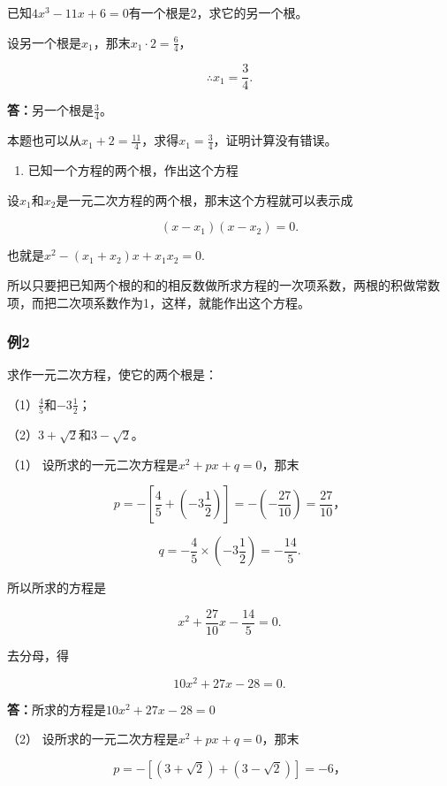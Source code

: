 已知\(4x^{3} - 11x + 6 = 0\)有一个根是2，求它的另一个根。

设另一个根是\(x_{1}\)，那末\(x_{1} \cdot 2 = \frac{6}{4}\)，

\[
\therefore x _ {1} = \frac{3}{4}.
\]

\textbf{答：}另一个根是\(\frac{3}{4}\)。

本题也可以从\(x_{1} + 2 = \frac{11}{4}\)，求得\(x_{1} = \frac{3}{4}\)，证明计算没有错误。

\begin{enumerate}[start=2]
\item
  已知一个方程的两个根，作出这个方程
\end{enumerate}

设\(x_{1}\)和\(x_{2}\)是一元二次方程的两个根，那末这个方程就可以表示成

\[
(x - x _ {1}) (x - x _ {2}) = 0.
\]

也就是\(x^{2} - (x_{1} + x_{2})x + x_{1}x_{2} = 0.\)

所以只要把已知两个根的和的相反数做所求方程的一次项系数，两根的积做常数项，而把二次项系数作为1，这样，就能作出这个方程。

\subsubsection{例2}

求作一元二次方程，使它的两个根是：

（1）\(\frac{4}{5}\)和\(-3\frac{1}{2}\)；

（2）\(3 + \sqrt{2}\)和\(3 - \sqrt{2}\)。

 （1） 设所求的一元二次方程是\(x^{2} + px + q = 0\)，那末

\[
p = - \left[ \frac{4}{5} + \left(- 3 \frac{1}{2}\right) \right] = - \left(- \frac{27}{10}\right) = \frac{27}{10}\text{，}
\]

\[
q = - \frac{4}{5} \times \left(- 3 \frac{1}{2}\right) = - \frac{14}{5}.
\]

所以所求的方程是

\[
x ^ {2} + \frac{27}{10} x - \frac{14}{5} = 0.
\]

去分母，得

\[
10 x ^ {2} + 27 x - 28 = 0.
\]

\textbf{答：}所求的方程是\(10x^{2} + 27x - 28 = 0\)

（2） 设所求的一元二次方程是\(x^{2} + px + q = 0\)，那末

\[
p = - [ (3 + \sqrt {2}) + (3 - \sqrt {2}) ] = - 6\text{，}
\]

